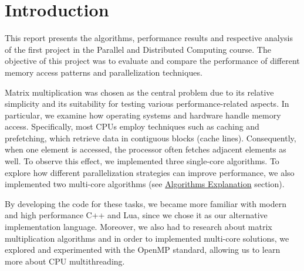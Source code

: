 \section{Introduction} \label{section:introduction}

This report presents the algorithms, performance results and respective analysis of the first project in the Parallel and Distributed Computing course. The objective of this project was to evaluate and compare the performance of different memory access patterns and parallelization techniques. 

Matrix multiplication was chosen as the central problem due to its relative simplicity and its suitability for testing various performance-related aspects. In particular, we examine how operating systems and hardware handle memory access. Specifically, most CPUs employ techniques such as caching and prefetching, which retrieve data in contiguous blocks (cache lines). Consequently, when one element is accessed, the processor often fetches adjacent elements as well. To observe this effect, we implemented three single-core algorithms. To explore how different parallelization strategies can improve performance, we also implemented two multi-core algorithms (see \hyperref[section:algorithms]{Algorithms Explanation} section). 

By developing the code for these tasks, we became more familiar with modern and high performance C++ and Lua, since we chose it as our alternative implementation language. Moreover, we also had to research about matrix multiplication algorithms and in order to implemented multi-core solutions, we explored and experimented with the OpenMP standard, allowing us to learn more about CPU multithreading. 
